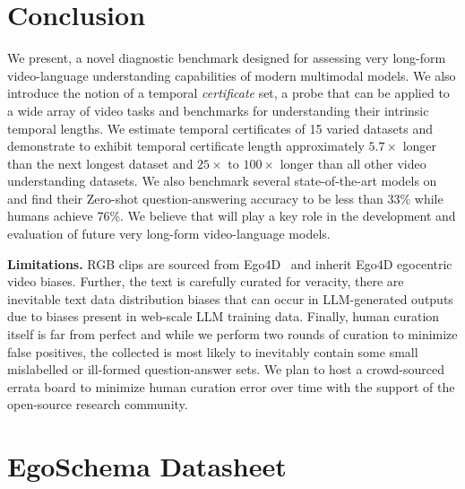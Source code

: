 \section{Conclusion}
We present\name{}{}, a novel diagnostic benchmark designed for assessing very long-form video-language understanding capabilities of modern multimodal models. We also introduce the notion of a temporal \textit{certificate} set, a probe that can be applied to a wide array of video tasks and benchmarks for understanding their intrinsic temporal lengths. We estimate temporal certificates of 15 varied datasets and demonstrate\name{}{} to exhibit temporal certificate length approximately $5.7\times$ longer than the next longest dataset and $25\times$ to $100\times$ longer than all other video understanding datasets. We also benchmark several state-of-the-art models on\name{}{} and find their Zero-shot question-answering accuracy to be less than $33\%$ while humans achieve 76\%. We believe that\name{}{} will play a key role in the development and evaluation of future very long-form video-language models.   

\noindent \textbf{Limitations.}\name{}{} RGB clips are sourced from Ego4D~\cite{ego4d} and inherit Ego4D egocentric video biases. Further, the text is carefully curated for veracity, there are inevitable text data distribution biases that can occur in LLM-generated outputs due to biases present in web-scale LLM training data. Finally, human curation itself is far from perfect and while we perform two rounds of curation to minimize false positives, the collected \name{}{} is most likely to inevitably contain some small mislabelled or ill-formed question-answer sets. We plan to host a crowd-sourced errata board to minimize human curation error over time with the support of the open-source research community. 

\newpage

\section*{EgoSchema Datasheet}
\label{sec:datasheet}



